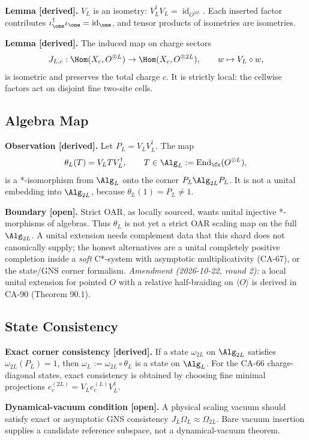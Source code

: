 \textbf{Lemma [derived].}  \(V_L\) is an isometry:
\(V_L^\dagger V_L=\operatorname{id}_{O^{\otimes L}}\).  Each inserted factor
contributes \(\iota_{\one}^\dagger\iota_{\one}=\operatorname{id}_{\one}\), and
tensor products of isometries are isometries.

\textbf{Lemma [derived].}  The induced map on charge sectors
\[
  J_{L,c}:\Hom(X_c,O^{\otimes L})\to\Hom(X_c,O^{\otimes 2L}),
  \qquad
  w\mapsto V_L\circ w,
\]
is isometric and preserves the total charge \(c\).  It is strictly local: the
cellwise factors act on disjoint fine two-site cells.

\subsection{Algebra Map}

\textbf{Observation [derived].}  Let \(P_L=V_LV_L^\dagger\).  The map
\[
  \theta_L(T)=V_LT V_L^\dagger,\qquad
  T\in \Alg_L:=\operatorname{End}_{\Cc}(O^{\otimes L}),
\]
is a *-isomorphism from \(\Alg_L\) onto the corner \(P_L\Alg_{2L}P_L\).  It is
not a unital embedding into \(\Alg_{2L}\), because \(\theta_L(1)=P_L\neq1\).

\textbf{Boundary [open].}  Strict OAR, as locally sourced, wants unital
injective *-morphisms of algebras.  Thus \(\theta_L\) is not yet a strict OAR
scaling map on the full \(\Alg_{2L}\).  A unital extension needs complement
data that this shard does not canonically supply; the honest alternatives are
a unital completely positive completion inside a \emph{soft} C*-system with
asymptotic multiplicativity (CA-67), or the state/GNS corner formalism.  \emph{Amendment (2026-10-22, round 2):}
a local unital extension for pointed \(O\) with a relative half-braiding on \(\langle O\rangle\) is derived in CA-90 (Theorem 90.1).

\subsection{State Consistency}

\textbf{Exact corner consistency [derived].}  If a state \(\omega_{2L}\) on
\(\Alg_{2L}\) satisfies \(\omega_{2L}(P_L)=1\), then
\(\omega_L:=\omega_{2L}\circ\theta_L\) is a state on \(\Alg_L\).  For the
CA-66 charge-diagonal states, exact consistency is obtained by choosing fine
minimal projections \(e_c^{(2L)}=V_Le_c^{(L)}V_L^\dagger\).

\textbf{Dynamical-vacuum condition [open].}  A physical scaling vacuum should
satisfy exact or asymptotic GNS consistency \(J_L\Omega_L\approx\Omega_{2L}\).
Bare vacuum insertion supplies a candidate reference subspace, not a
dynamical-vacuum theorem.

